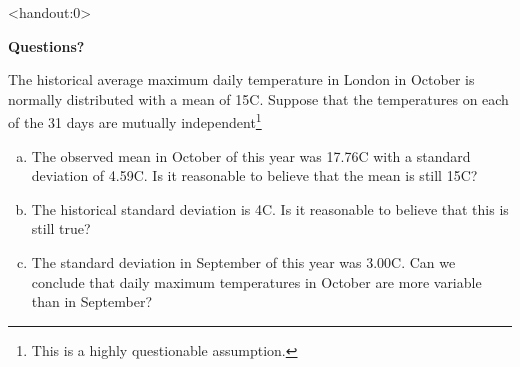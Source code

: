 \begin{frame}<handout:0>
  \begin{center}
    \Huge{\textbf{Questions?}}
  \end{center}
\end{frame}

\begin{frame}

  \begin{block}{\exercise}

  The historical average maximum daily temperature in London in October is normally distributed with a mean of 15C. Suppose that the temperatures on each of the 31 days are mutually independent\footnote{This is a highly questionable assumption.}
  \begin{enumerate}[a)]
  \item The observed mean in October of this year was 17.76C with a standard deviation of 4.59C. Is it reasonable to believe that the mean is still 15C?
  
  \item The historical standard deviation is 4C. Is it reasonable to believe that this is still true?
  
  \item The standard deviation in September of this year was 3.00C. Can we conclude that daily maximum temperatures in October are more variable than in September?
  \end{enumerate}
  \end{block}
\end{frame}


